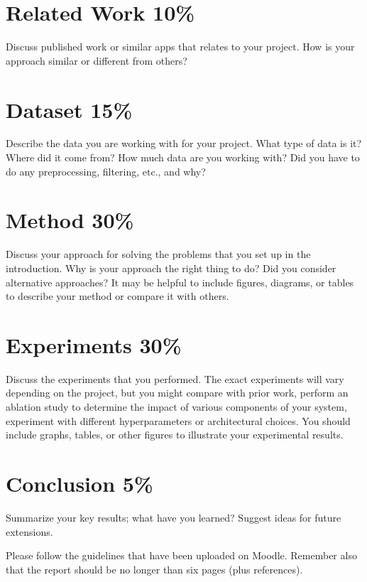 \documentclass[10pt,twocolumn,letterpaper]{article}
\begin{document}
\section{Related Work 10\%}
Discuss published work or similar apps that relates to your project. How is your approach similar or different from others?
\section{Dataset 15\%}
Describe the data you are working with for your project. What type of data is it? Where did it come from? How much data are you working with? Did you have to do any preprocessing, filtering, etc., and why?
\section{Method 30\%}
Discuss your approach for solving the problems that you set up in the introduction. Why is your approach the right thing to do? Did you consider alternative approaches? It may be helpful to include figures, diagrams, or tables to describe your method or compare it with others.
\section{Experiments 30\%}
Discuss the experiments that you performed. The exact experiments will vary depending on the project, but you might compare with prior work, perform an ablation study to determine the impact of various components of your system, experiment with different hyperparameters or architectural choices. You should include graphs, tables, or other figures to illustrate your experimental results.
\section{Conclusion 5\%}
Summarize your key results; what have you learned? Suggest ideas for future extensions.

Please follow the guidelines that have been uploaded on Moodle. Remember also that the report should be no longer than six pages (plus references).

\end{document}
